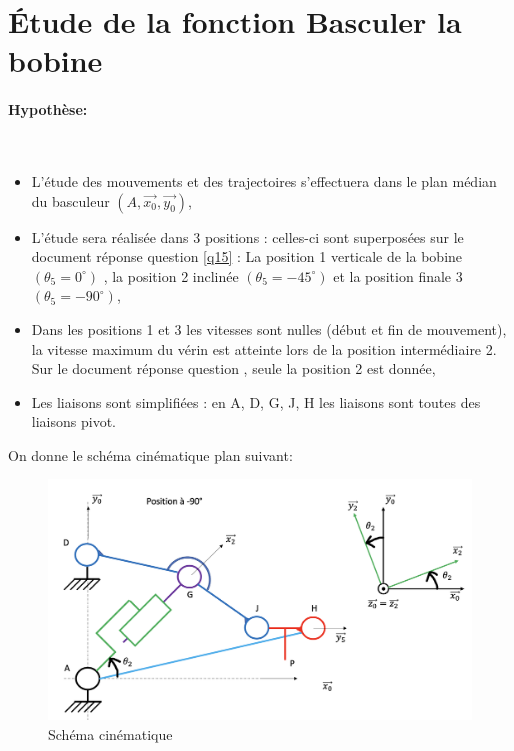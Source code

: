 


\newpage

\section{Étude de la fonction \og Basculer la bobine \fg}

\paragraph{Hypothèse:} ~\ 
\begin{itemize}
 \item L'étude des mouvements et des trajectoires s'effectuera dans le plan médian du basculeur $(A,\overrightarrow{x_0},\overrightarrow{y_0})$,
 \item L'étude sera réalisée dans 3 positions : celles-ci sont superposées sur le document réponse question \ref{q15} : La position 1 verticale de la bobine $(\theta_5=0^{\circ})$ , la position 2 inclinée $(\theta_5=-45^{\circ})$ et la position finale 3 $(\theta_5=-90^{\circ})$,
 \item Dans les positions 1 et 3 les vitesses sont nulles (début et fin de mouvement), la vitesse maximum du vérin est atteinte lors de la position intermédiaire 2. Sur le document réponse question \label{q16}, seule la position 2 est donnée,
 \item Les liaisons sont simplifiées : en A, D, G, J, H les liaisons sont toutes des liaisons pivot.
\end{itemize}

On donne le schéma cinématique plan suivant:

\begin{figure}[ht!]
\begin{center}
 \includegraphics[width=0.7\linewidth]{img/fig07}
\end{center}
\caption{Schéma cinématique}
\label{fig07}
\end{figure}

